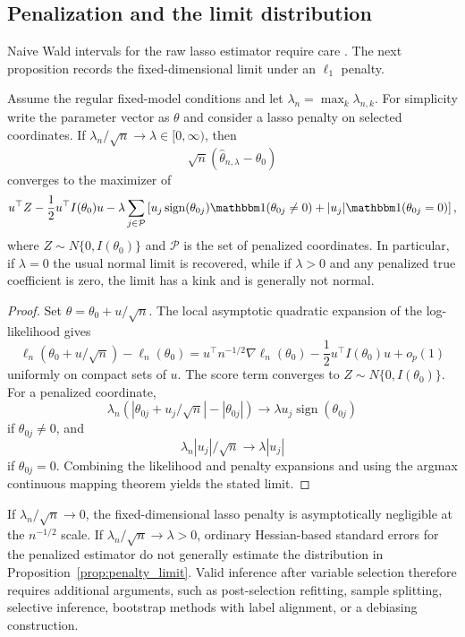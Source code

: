 \subsection{Penalization and the limit distribution}

Naive Wald intervals for the raw lasso estimator require care
\citep{knight2000asymptotics,leeb2005selection}.  The next proposition records
the fixed-dimensional limit under an \(\ell_1\) penalty.

\begin{proposition}
\label{prop:penalty_limit}
Assume the regular fixed-model conditions and let
\(\lambda_n=\max_k\lambda_{n,k}\).  For simplicity write the parameter vector as
\(\theta\) and consider a lasso penalty on selected coordinates.  If
\(\lambda_n/\sqrt n\to\lambda\in[0,\infty)\), then
\[
    \sqrt n(\hat\theta_{n,\lambda}-\theta_0)
\]
converges to the maximizer of
\[
    u^\top Z-\frac12 u^\top I(\theta_0)u
    -
    \lambda
    \sum_{j\in\mathcal P}
    \left[
        u_j\operatorname{sign}(\theta_{0j})\mathbbm 1(\theta_{0j}\neq 0)
        +
        |u_j|\mathbbm 1(\theta_{0j}=0)
    \right],
\]
where \(Z\sim N\{0,I(\theta_0)\}\) and \(\mathcal P\) is the set of penalized
coordinates.  In particular, if \(\lambda=0\) the usual normal limit is
recovered, while if \(\lambda>0\) and any penalized true coefficient is zero,
the limit has a kink and is generally not normal.
\end{proposition}

\begin{proof}
Set \(\theta=\theta_0+u/\sqrt n\).  The local asymptotic quadratic expansion of
the log-likelihood gives
\[
    \ell_n(\theta_0+u/\sqrt n)-\ell_n(\theta_0)
    =
    u^\top n^{-1/2}\nabla\ell_n(\theta_0)
    -
    \frac12 u^\top I(\theta_0)u
    +
    o_p(1)
\]
uniformly on compact sets of \(u\).  The score term converges to
\(Z\sim N\{0,I(\theta_0)\}\).  For a penalized coordinate,
\[
    \lambda_n\left(
        |\theta_{0j}+u_j/\sqrt n|-|\theta_{0j}|
    \right)
    \to
    \lambda u_j\operatorname{sign}(\theta_{0j})
\]
if \(\theta_{0j}\neq0\), and
\[
    \lambda_n|u_j|/\sqrt n\to \lambda |u_j|
\]
if \(\theta_{0j}=0\).  Combining the likelihood and penalty expansions and
using the argmax continuous mapping theorem yields the stated limit.
\end{proof}

\begin{corollary}
If \(\lambda_n/\sqrt n\to0\), the fixed-dimensional lasso penalty is
asymptotically negligible at the \(n^{-1/2}\) scale.  If
\(\lambda_n/\sqrt n\to\lambda>0\), ordinary Hessian-based standard errors for
the penalized estimator do not generally estimate the distribution in
Proposition~\ref{prop:penalty_limit}.  Valid inference after variable selection
therefore requires additional arguments, such as post-selection refitting,
sample splitting, selective inference, bootstrap methods with label alignment,
or a debiasing construction.
\end{corollary}

